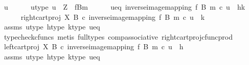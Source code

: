 \begin{isabellebody}
\ u\isanewline
\ \ \ \ \isamarkupfalse%
\ u{\isacharunderscore}{\kern0pt}type{\isacharcolon}{\kern0pt}\ {\isachardoublequoteopen}u\ {\isacharcolon}{\kern0pt}\ Z\ {\isasymrightarrow}\ {\isacharparenleft}{\kern0pt}f\isactrlsup {\isacharminus}{\kern0pt}B{\isasymrparr}\isactrlbsub m\isactrlesub {\isacharparenright}{\kern0pt}{\isachardoublequoteclose}\isanewline
\ \ \ \ \isamarkupfalse%
\ u{\isacharunderscore}{\kern0pt}eq{\isacharcolon}{\kern0pt}\ {\isachardoublequoteopen}inverse{\isacharunderscore}{\kern0pt}image{\isacharunderscore}{\kern0pt}mapping\ f\ B\ m\ {\isasymcirc}\isactrlsub c\ u\ {\isacharequal}{\kern0pt}\ {\isasymlangle}h{\isacharcomma}{\kern0pt}k{\isasymrangle}{\isachardoublequoteclose}\isanewline
\isanewline
\ \ \ \ \isamarkupfalse%
\ {\isachardoublequoteopen}{\isacharparenleft}{\kern0pt}right{\isacharunderscore}{\kern0pt}cart{\isacharunderscore}{\kern0pt}proj\ X\ B\ {\isasymcirc}\isactrlsub c\ inverse{\isacharunderscore}{\kern0pt}image{\isacharunderscore}{\kern0pt}mapping\ f\ B\ m{\isacharparenright}{\kern0pt}\ {\isasymcirc}\isactrlsub c\ u\ {\isacharequal}{\kern0pt}\ k{\isachardoublequoteclose}\isanewline
\ \ \ \ \ \ \isamarkupfalse%
\ assms\ u{\isacharunderscore}{\kern0pt}type\ h{\isacharunderscore}{\kern0pt}type\ k{\isacharunderscore}{\kern0pt}type\ u{\isacharunderscore}{\kern0pt}eq\isanewline
\ \ \ \ \ \ \isamarkupfalse%
\ {\isacharparenleft}{\kern0pt}typecheck{\isacharunderscore}{\kern0pt}cfuncs{\isacharcomma}{\kern0pt}\ metis\ {\isacharparenleft}{\kern0pt}full{\isacharunderscore}{\kern0pt}types{\isacharparenright}{\kern0pt}\ comp{\isacharunderscore}{\kern0pt}associative{}\ right{\isacharunderscore}{\kern0pt}cart{\isacharunderscore}{\kern0pt}proj{\isacharunderscore}{\kern0pt}cfunc{\isacharunderscore}{\kern0pt}prod{\isacharparenright}{\kern0pt}\isanewline
\isanewline
\ \ \ \ \isamarkupfalse%
\ {\isachardoublequoteopen}{\isacharparenleft}{\kern0pt}left{\isacharunderscore}{\kern0pt}cart{\isacharunderscore}{\kern0pt}proj\ X\ B\ {\isasymcirc}\isactrlsub c\ inverse{\isacharunderscore}{\kern0pt}image{\isacharunderscore}{\kern0pt}mapping\ f\ B\ m{\isacharparenright}{\kern0pt}\ {\isasymcirc}\isactrlsub c\ u\ {\isacharequal}{\kern0pt}\ h{\isachardoublequoteclose}\isanewline
\ \ \ \ \ \ \isamarkupfalse%
\ assms\ u{\isacharunderscore}{\kern0pt}type\ h{\isacharunderscore}{\kern0pt}type\ k{\isacharunderscore}{\kern0pt}type\ u{\isacharunderscore}{\kern0pt}eq\isanewline
\ \ \ \ \ \ \isamarkupfalse%

\end{isabellebody}
